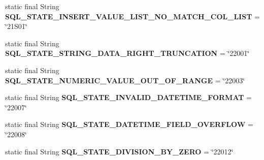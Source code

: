 \begin{DoxyCompactItemize}
\item 
\mbox{\label{classcom_1_1mysql_1_1cj_1_1exceptions_1_1_mysql_error_numbers_a7024da64c660a9dde128c51259953b62}} 
static final String {\bfseries S\+Q\+L\+\_\+\+S\+T\+A\+T\+E\+\_\+\+I\+N\+S\+E\+R\+T\+\_\+\+V\+A\+L\+U\+E\+\_\+\+L\+I\+S\+T\+\_\+\+N\+O\+\_\+\+M\+A\+T\+C\+H\+\_\+\+C\+O\+L\+\_\+\+L\+I\+ST} = \char`\"{}21\+S01\char`\"{}
\item 
\mbox{\label{classcom_1_1mysql_1_1cj_1_1exceptions_1_1_mysql_error_numbers_ae65e1100581b4b9e678e0ded3c8c4f2e}} 
static final String {\bfseries S\+Q\+L\+\_\+\+S\+T\+A\+T\+E\+\_\+\+S\+T\+R\+I\+N\+G\+\_\+\+D\+A\+T\+A\+\_\+\+R\+I\+G\+H\+T\+\_\+\+T\+R\+U\+N\+C\+A\+T\+I\+ON} = \char`\"{}22001\char`\"{}
\item 
\mbox{\label{classcom_1_1mysql_1_1cj_1_1exceptions_1_1_mysql_error_numbers_ac9669cddd7ebbbfeceda0dce120c3991}} 
static final String {\bfseries S\+Q\+L\+\_\+\+S\+T\+A\+T\+E\+\_\+\+N\+U\+M\+E\+R\+I\+C\+\_\+\+V\+A\+L\+U\+E\+\_\+\+O\+U\+T\+\_\+\+O\+F\+\_\+\+R\+A\+N\+GE} = \char`\"{}22003\char`\"{}
\item 
\mbox{\label{classcom_1_1mysql_1_1cj_1_1exceptions_1_1_mysql_error_numbers_a991feb0d5a2d1663bf886e963190a5b3}} 
static final String {\bfseries S\+Q\+L\+\_\+\+S\+T\+A\+T\+E\+\_\+\+I\+N\+V\+A\+L\+I\+D\+\_\+\+D\+A\+T\+E\+T\+I\+M\+E\+\_\+\+F\+O\+R\+M\+AT} = \char`\"{}22007\char`\"{}
\item 
\mbox{\label{classcom_1_1mysql_1_1cj_1_1exceptions_1_1_mysql_error_numbers_ac8b71b48645cae2452d5d99d7fe3a106}} 
static final String {\bfseries S\+Q\+L\+\_\+\+S\+T\+A\+T\+E\+\_\+\+D\+A\+T\+E\+T\+I\+M\+E\+\_\+\+F\+I\+E\+L\+D\+\_\+\+O\+V\+E\+R\+F\+L\+OW} = \char`\"{}22008\char`\"{}
\item 
\mbox{\label{classcom_1_1mysql_1_1cj_1_1exceptions_1_1_mysql_error_numbers_aa5b35e9355625b8f9895eb52152771f8}} 
static final String {\bfseries S\+Q\+L\+\_\+\+S\+T\+A\+T\+E\+\_\+\+D\+I\+V\+I\+S\+I\+O\+N\+\_\+\+B\+Y\+\_\+\+Z\+E\+RO} = \char`\"{}22012\char`\"{}

\end{DoxyCompactItemize}

